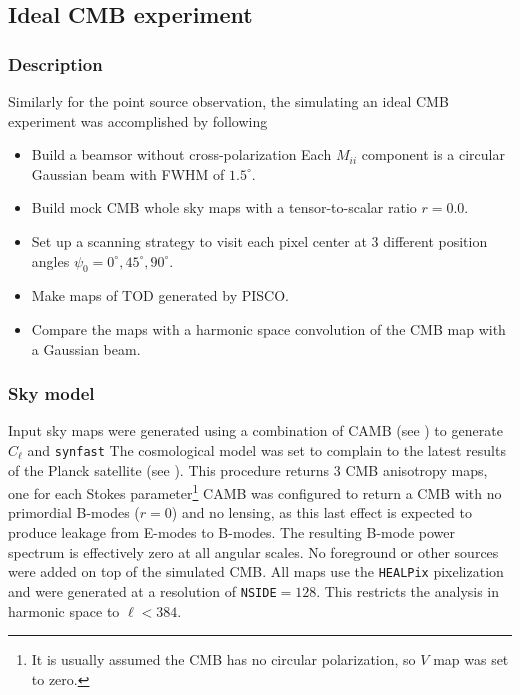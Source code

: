 \documentclass[a4paper,11pt]{article}
\begin{document}
\subsection{Ideal CMB experiment}
\label{sec::ideal_full_sky}

\subsubsection{Description}

Similarly for the point source observation, the simulating an ideal CMB experiment was accomplished by following

\begin{itemize}
	\item Build a beamsor without cross-polarization Each $M_{ii}$ component is a circular Gaussian beam with FWHM of $1.5^\circ$.
	\item Build mock CMB whole sky maps with a tensor-to-scalar ratio $r=0.0$.
	\item Set up a scanning strategy to visit each pixel center at 3 different position angles $\psi_0 = 0^{\circ},45^{\circ},90^{\circ}$. 
	\item Make maps of TOD generated by PISCO. 
	\item Compare the maps with a harmonic space convolution of the CMB map with a Gaussian beam.
\end{itemize}

\subsubsection{Sky model}

Input sky maps were generated using a combination of CAMB (see \cite{Lewis:2002ah}) to generate $C_\ell$ and \texttt{synfast} The cosmological model was set to complain to the latest results of the Planck satellite (see \cite{2016A&A...594A..13P}). This procedure returns 3 CMB anisotropy maps, one for each Stokes parameter\footnote{It is usually assumed the CMB has no circular polarization, so $V$ map was set to zero.} CAMB was configured to return a CMB with no primordial B-modes ($r=0$) and no lensing, as this last effect is expected to produce leakage from E-modes to B-modes. The resulting B-mode power spectrum is effectively zero at all angular scales. No foreground or other sources were added on top of the simulated CMB. All maps use the \texttt{HEALPix} pixelization and were generated at a resolution of \texttt{NSIDE}$=128$. This restricts the analysis in harmonic space to $\ell < 384$.
\end{document}
